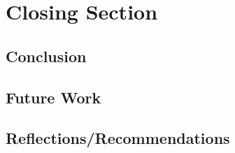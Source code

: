 \section{Closing Section}
\subsection{Conclusion}
\subsection{Future Work}
\subsection{Reflections/Recommendations}
